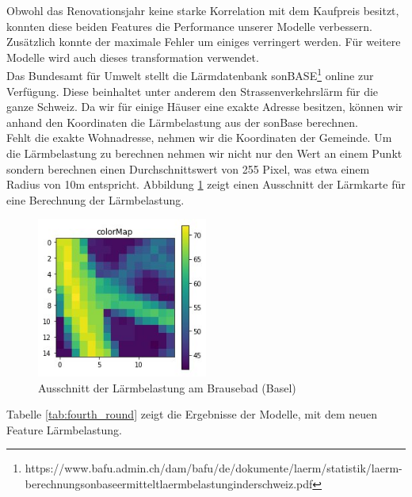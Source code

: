 %
Obwohl das Renovationsjahr keine starke Korrelation mit dem Kaufpreis besitzt, konnten diese beiden Features die Performance unserer Modelle verbessern. Zusätzlich konnte der maximale Fehler um einiges verringert werden. Für weitere Modelle wird auch dieses transformation verwendet.\\[2ex]
%
Das Bundesamt für Umwelt stellt die Lärmdatenbank sonBASE\footnote{https://www.bafu.admin.ch/dam/bafu/de/dokumente/laerm/statistik/laerm-berechnungsonbaseermitteltlaermbelastunginderschweiz.pdf} online zur Verfügung. Diese beinhaltet unter anderem den Strassenverkehrslärm für die ganze Schweiz. Da wir für einige Häuser eine exakte Adresse besitzen, können wir anhand den Koordinaten die Lärmbelastung aus der sonBase berechnen.\\
Fehlt die exakte Wohnadresse, nehmen wir die Koordinaten der Gemeinde. Um die Lärmbelastung zu berechnen nehmen wir nicht nur den Wert an einem Punkt sondern berechnen einen Durchschnittswert von 255 Pixel, was etwa einem Radius von 10m entspricht. Abbildung \ref{fig:noise} zeigt einen Ausschnitt der Lärmkarte für eine Berechnung der Lärmbelastung.\\[2ex]
\begin{figure}[ht]
\centering
\includegraphics[width=0.5\textwidth]{images/noise.jpeg}
\caption[Ausschnitt der Lärmbelastung am Brausebad (Basel)]{Ausschnitt der Lärmbelastung am Brausebad (Basel)}
\label{fig:noise}
\end{figure}
\newline
%
Tabelle \ref{tab:fourth_round} zeigt die Ergebnisse der Modelle, mit dem neuen Feature Lärmbelastung.\\[2ex]
%
\begin{table}[ht]
\centering
{}
\caption{Ergebnisse mit Einbezug der Lärmbelastung}
\label{tab:fourth_round}
\end{table}
